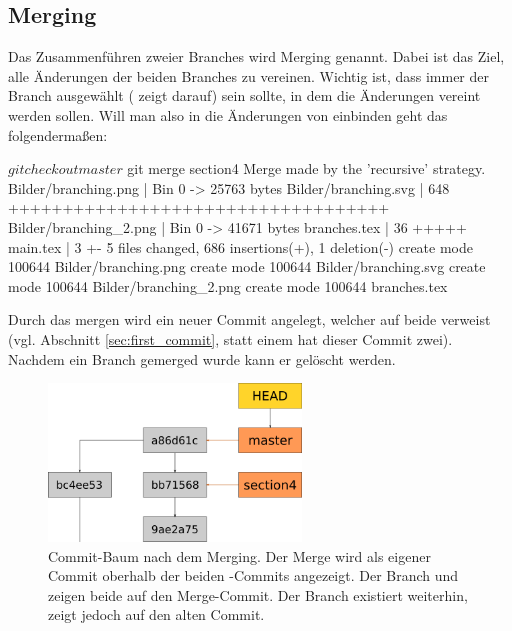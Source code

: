 \subsection{Merging}
Das Zusammenführen zweier Branches wird Merging genannt. Dabei ist das Ziel, alle Änderungen der beiden Branches zu vereinen. Wichtig ist, dass immer der Branch ausgewählt ( zeigt darauf) sein sollte, in dem die Änderungen vereint werden sollen. Will man also in  die Änderungen von  einbinden geht das folgendermaßen:
\begin{mplisting}
$ git checkout master
$ git merge section4
Merge made by the 'recursive' strategy.
Bilder/branching.png   | Bin 0 -> 25763 bytes
Bilder/branching.svg   | 648 +++++++++++++++++++++++++++++++++++
Bilder/branching_2.png | Bin 0 -> 41671 bytes
branches.tex           |  36 +++++
main.tex               |   3 +-
5 files changed, 686 insertions(+), 1 deletion(-)
create mode 100644 Bilder/branching.png
create mode 100644 Bilder/branching.svg
create mode 100644 Bilder/branching_2.png
create mode 100644 branches.tex
\end{mplisting}
Durch das mergen wird ein neuer Commit angelegt, welcher auf beide   verweist (vgl. Abschnitt \ref{sec:first_commit}, statt einem  hat dieser Commit zwei). Nachdem ein Branch gemerged wurde kann er gelöscht werden.
\begin{figure}[!ht]
	\centering
	\includegraphics[width=0.6\textwidth]{Bilder/branching_3.png}
	\caption{Commit-Baum nach dem Merging. Der Merge wird als eigener Commit oberhalb der beiden -Commits angezeigt. Der  Branch und  zeigen beide auf den Merge-Commit. Der  Branch existiert weiterhin, zeigt jedoch auf den alten Commit.}
	\label{fig:merge}
\end{figure}


